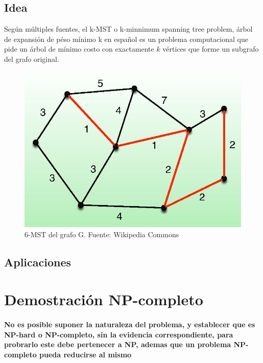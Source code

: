 \documentclass[spanish,12pt]{elsarticle}
\begin{document}
\subsection{Idea}
Según múltiples fuentes\cite{2}\cite{4}, el k-MST o k-minnimum spanning tree problem, árbol de expansión de péso mínimo k en español es un problema computacional que pide un árbol de mínimo costo con exactamente $k$ vértices que forme un subgrafo del grafo original.
\begin{figure}[h]
    \centering
    \includegraphics[scale=0.5]{images/6-mst.jpg}
    \caption{6-MST del grafo G. Fuente: Wikipedia Commons}
    \label{fig:my_label}
\end{figure}
\subsection{Aplicaciones}



\section{Demostración NP-completo}
\paragraph{\textnormal{No es posible suponer la naturaleza del problema, y establecer que es NP-hard o NP-completo, sin la evidencia correspondiente, para probrarlo este debe pertenecer a NP, ademas que un problema NP-completo pueda reducirse al mismo}}
\end{document}
